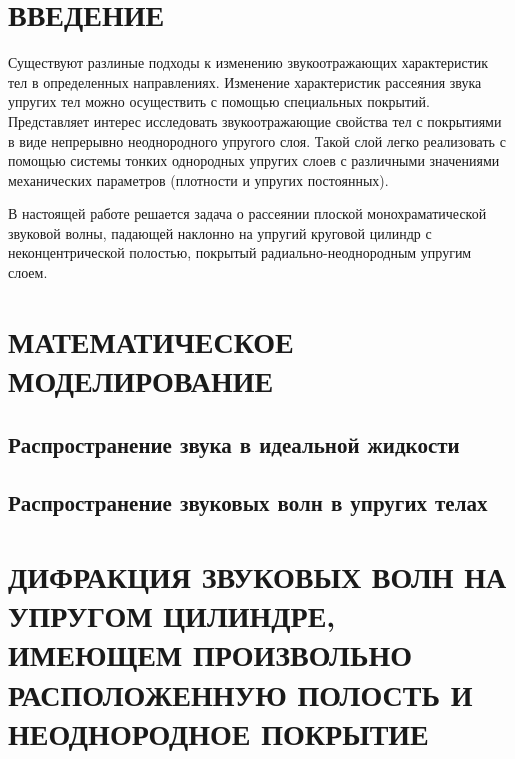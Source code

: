 

\renewcommand{\bibname}{СПИСОК ИСПОЛЬЗОВАННЫХ ИСТОЧНИКОВ}
\renewcommand\refname{СПИСОК ИСПОЛЬЗОВАННЫХ ИСТОЧНИКОВ}

%

\setcounter{page}{2}
\thispagestyle {empty}
\renewcommand{\contentsname}{\centering СОДЕРЖАНИЕ}
\tableofcontents

\newpage
\section*{ВВЕДЕНИЕ}

Существуют разлиные подходы к изменению звукоотражающих характеристик тел в определенных направлениях. Изменение характеристик рассеяния звука упругих тел можно осуществить с помощью специальных покрытий. Представляет интерес исследовать звукоотражающие свойства тел с покрытиями в виде непрерывно неоднородного упругого слоя. Такой слой легко реализовать с помощью системы тонких однородных упругих слоев с различными значениями механических параметров (плотности и упругих постоянных).

В настоящей работе решается задача о рассеянии плоской монохраматической звуковой волны, падающей наклонно на упругий круговой цилиндр с неконцентрической полостью, покрытый радиально-неоднородным упругим слоем.

\newpage
\section{МАТЕМАТИЧЕСКОЕ МОДЕЛИРОВАНИЕ}

\newpage
\subsection{Распространение звука в идеальной жидкости}

\newpage
\subsection{Распространение звуковых волн в упругих телах}

\newpage
\section{ДИФРАКЦИЯ ЗВУКОВЫХ ВОЛН НА УПРУГОМ ЦИЛИНДРЕ, ИМЕЮЩЕМ ПРОИЗВОЛЬНО РАСПОЛОЖЕННУЮ ПОЛОСТЬ И НЕОДНОРОДНОЕ ПОКРЫТИЕ}

